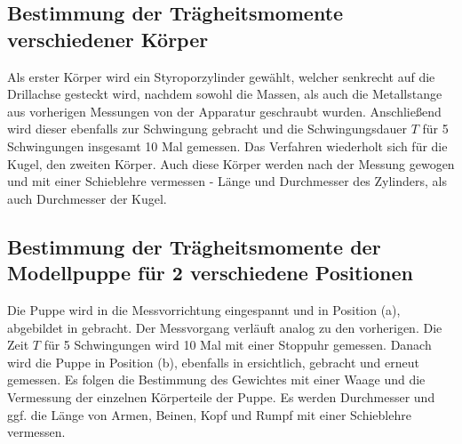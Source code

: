 \subsection{Bestimmung der Trägheitsmomente verschiedener Körper}
Als erster Körper wird ein Styroporzylinder gewählt, welcher senkrecht auf die Drillachse gesteckt wird, 
nachdem sowohl die Massen, als auch die Metallstange aus vorherigen Messungen von der Apparatur geschraubt wurden. 
Anschließend wird dieser ebenfalls zur Schwingung gebracht und die Schwingungsdauer $T$ für 5 Schwingungen insgesamt 10 Mal gemessen. 
Das Verfahren wiederholt sich für die Kugel, den zweiten Körper. 
Auch diese Körper werden nach der Messung gewogen und mit einer Schieblehre vermessen - Länge und Durchmesser des Zylinders, als auch Durchmesser der Kugel. 

\subsection{Bestimmung der Trägheitsmomente der Modellpuppe für 2 verschiedene Positionen}
Die Puppe wird in die Messvorrichtung eingespannt und in Position (a), abgebildet in %
gebracht. 
Der Messvorgang verläuft analog zu den vorherigen. 
Die Zeit $T$ für 5 Schwingungen wird 10 Mal mit einer Stoppuhr gemessen. 
Danach wird die Puppe in Position (b), ebenfalls in %
ersichtlich, gebracht und erneut gemessen. 
Es folgen die Bestimmung des Gewichtes mit einer Waage und die Vermessung der einzelnen Körperteile der Puppe. 
Es werden Durchmesser und ggf. die Länge von Armen, Beinen, Kopf und Rumpf mit einer Schieblehre vermessen.

